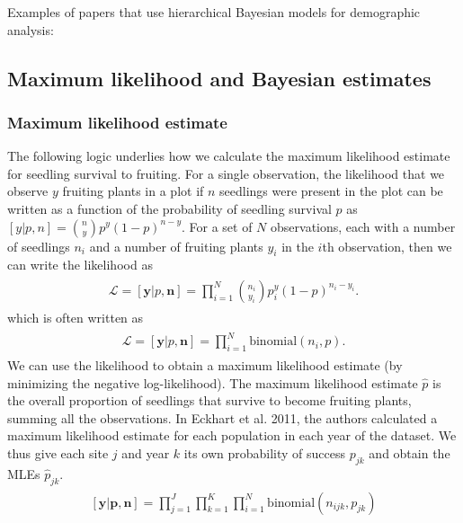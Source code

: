 \documentclass[12pt, oneside, titlepage]{article}   	%
\begin{document}
Examples of papers that use hierarchical Bayesian models for demographic analysis: \cite{clark2003,evans2010}

\subsection*{Maximum likelihood and Bayesian estimates}
\subsubsection*{Maximum likelihood estimate}

The following logic underlies how we calculate the maximum likelihood estimate for seedling survival to fruiting. For a single observation, the likelihood that we observe $y$ fruiting plants in a plot if $n$ seedlings were present in the plot can be written as a function of the probability of seedling survival $p$ as $[y|p,n] = \binom{n}{y}p^y(1-p)^{n-y}$. For a set of $N$ observations, each with a number of seedlings $n_i$ and a number of fruiting plants $y_i$ in the $i$th observation, then we can write the likelihood as
%
\begin{align}
  \begin{split}
\mathcal{L} = [\bm{y}|p,\bm{n}]  = \prod_{i=1}^N \binom{n_i}{y_i}p^y_i(1-p)^{n_i-y_i}.
  \end{split}
\end{align}
%
which is often written as
%
\begin{align}
  \begin{split}
\mathcal{L} = [\bm{y}|p,\bm{n}]  = \prod_{i=1}^N \mathrm{binomial}(n_i,p).
  \end{split}
\end{align}
We can use the likelihood to obtain a maximum likelihood estimate (by minimizing the negative log-likelihood). The maximum likelihood estimate $\hat{p}$ is the overall proportion of seedlings that survive to become fruiting plants, summing all the observations. In Eckhart et al. 2011, the authors calculated a maximum likelihood estimate for each population in each year of the dataset. We thus give each site $j$ and year $k$ its own probability of success $p_{jk}$ and obtain the MLEs $\hat{p}_{jk}$.
%
\begin{align}
  \begin{split}
[\bm{y}|\bm{p},\bm{n}]  = \prod_{j=1}^J\prod_{k=1}^K\prod_{i=1}^N \mathrm{binomial}(n_{ijk},p_{jk}) \label{eq:frequentistMLE}
  \end{split}
\end{align}
\end{document}

